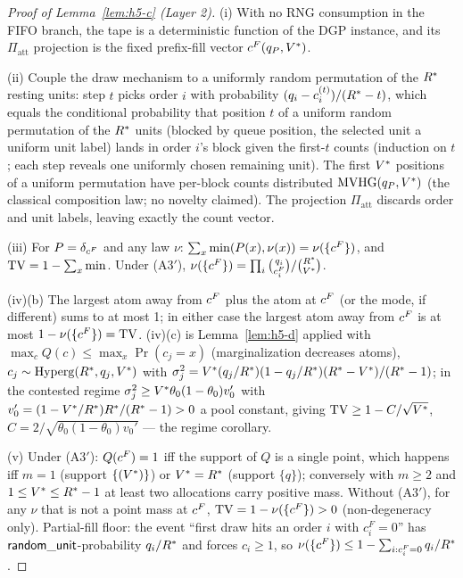 \begin{proof}[Proof of Lemma~\ref{lem:h5-c} (Layer 2)]
(i) With no RNG consumption in the FIFO branch, the tape is a deterministic
function of the DGP instance, and its $\Pi_{\mathrm{att}}$ projection is the
fixed prefix-fill vector $c^{F}(q_{P}, V^{*})$.

(ii) Couple the draw mechanism to a uniformly random permutation of the
$R^{*}$ resting units: step $t$ picks order $i$ with probability
$(q_i - c_i^{(t)})/(R^{*} - t)$, which equals the conditional probability
that position $t$ of a uniform random permutation of the $R^{*}$ units
(blocked by queue position, the selected unit a uniform unit label) lands in
order $i$'s block given the first-$t$ counts (induction on $t$; each step
reveals one uniformly chosen remaining unit). The first $V^{*}$ positions
of a uniform permutation have per-block counts distributed
$\operatorname{MVHG}(q_{P}, V^{*})$ (the classical composition law; no novelty claimed).
The projection $\Pi_{\mathrm{att}}$ discards order and unit labels, leaving
exactly the count vector.

(iii) For $P = \delta_{c^{F}}$ and any law $\nu$:
$\sum_x\min(P(x), \nu(x)) = \nu(\{c^{F}\})$, and
$\operatorname{TV} = 1 - \sum_x\min$. Under (A3$'$), $\nu(\{c^{F}\}) =
\prod_i\binom{q_i}{c_i^{F}}/\binom{R^{*}}{V^{*}}$.

(iv)(b) The largest atom away from $c^{F}$ plus the atom at $c^{F}$ (or the
mode, if different) sums to at most 1; in either case the largest atom away
from $c^{F}$ is at most $1 - \nu(\{c^{F}\}) = \operatorname{TV}$. (iv)(c) is
Lemma~\ref{lem:h5-d} applied with
$\max_c Q(c) \le \max_x \Pr(c_j = x)$ (marginalization decreases atoms),
$c_j \sim \mathrm{Hyperg}(R^{*}, q_j, V^{*})$ with
$\sigma_j^2 = V^{*}(q_j/R^{*})(1 - q_j/R^{*})(R^{*} -
V^{*})/(R^{*} - 1)$; in the contested regime
$\sigma_j^2 \ge V^{*}\theta_0(1-\theta_0)v_0'$ with
$v_0' = (1 - V^{*}/R^{*})R^{*}/(R^{*} - 1) > 0$ a pool constant, giving
$\operatorname{TV} \ge 1 - C/\sqrt{V^{*}}$,
$C = 2/\sqrt{\theta_0(1-\theta_0)v_0'}$ --- the regime corollary.

(v) Under (A3$'$): $Q(c^{F}) = 1$ iff the support of $Q$ is a single point,
which happens iff $m = 1$ (support $\{(V^{*})\}$) or $V^{*} = R^{*}$
(support $\{q\}$); conversely with $m \ge 2$ and
$1 \le V^{*} \le R^{*} - 1$ at least two allocations carry positive mass.
Without (A3$'$), for any $\nu$ that is not a point mass at $c^{F}$,
$\operatorname{TV} = 1 - \nu(\{c^{F}\}) > 0$ (non-degeneracy only). Partial-fill floor: the
event ``first draw hits an order $i$ with $c_i^{F} = 0$'' has
$\mathsf{random\_unit}$-probability $q_i/R^{*}$ and forces $c_i \ge 1$, so
$\nu(\{c^{F}\}) \le 1 - \sum_{i : c_i^{F} = 0}q_i/R^{*}$.


\end{proof}
